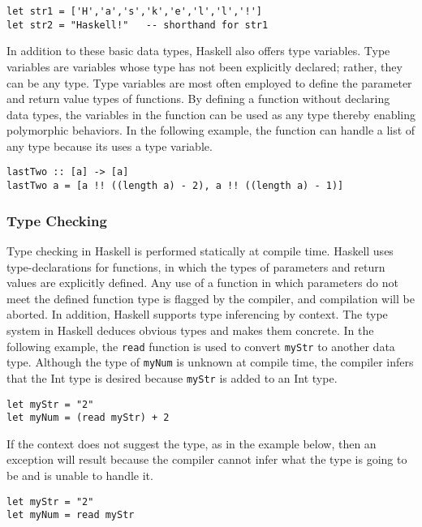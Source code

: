 \documentclass[titlepage,12pt]{article}
\begin{document}
\begin{verbatim}
let str1 = ['H','a','s','k','e','l','l','!']
let str2 = "Haskell!"   -- shorthand for str1
\end{verbatim}

In addition to these basic data types, Haskell also offers type variables. Type variables are variables whose type has 
not been explicitly declared; rather, they can be any type.  Type variables are most often employed to define the parameter
and return value types of functions. By defining a function without declaring data types, the 
variables in the function can be used as any type thereby enabling polymorphic behaviors. In the following example, the 
function can handle a list of any type because its uses a type variable. 

\begin{verbatim}
lastTwo :: [a] -> [a]
lastTwo a = [a !! ((length a) - 2), a !! ((length a) - 1)]
\end{verbatim}

\subsubsection{Type Checking}
Type checking in Haskell is performed statically at compile time. Haskell uses type-declarations for functions, in 
which the types of parameters and return values are explicitly defined. Any use of a function in which parameters 
do not meet the defined function type is flagged by the compiler, and compilation will be aborted. In addition, 
Haskell supports type inferencing by context. The type system in Haskell deduces obvious types and makes them concrete. In the 
following example, the \texttt{read} function is used to convert \texttt{myStr} to another data type.
Although the type of \texttt{myNum} is unknown at compile time, the compiler infers that the Int type 
is desired because \texttt{myStr} is added to an Int type. 

\begin{verbatim}
let myStr = "2" 
let myNum = (read myStr) + 2
\end{verbatim}

If the context does not suggest the type, as in the example below, then an exception will result because the 
compiler cannot infer what the type is going to be and is unable to handle it. 

\begin{verbatim}
let myStr = "2" 
let myNum = read myStr
\end{verbatim}
\end{document}

